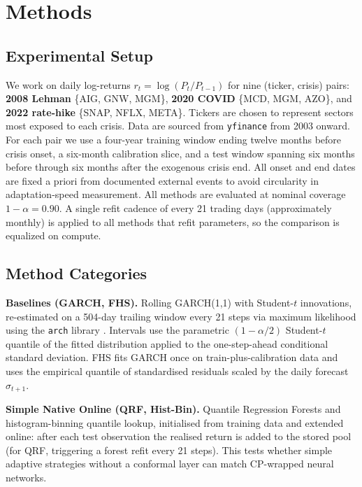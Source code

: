 \documentclass{article}
\begin{document}
\section{Methods}

\subsection{Experimental Setup}

We work on daily log-returns \(r_t = \log(P_t / P_{t-1})\) for nine (ticker, crisis) pairs: \textbf{2008 Lehman} \{AIG, GNW, MGM\}, \textbf{2020 COVID} \{MCD, MGM, AZO\}, and \textbf{2022 rate-hike} \{SNAP, NFLX, META\}. Tickers are chosen to represent sectors most exposed to each crisis. Data are sourced from \texttt{yfinance} from 2003 onward. For each pair we use a four-year training window ending twelve months before crisis onset, a six-month calibration slice, and a test window spanning six months before through six months after the exogenous crisis end. All onset and end dates are fixed a priori from documented external events to avoid circularity in adaptation-speed measurement. All methods are evaluated at nominal coverage \(1 - \alpha = 0.90\). A single refit cadence of every 21 trading days (approximately monthly) is applied to all methods that refit parameters, so the comparison is equalized on compute.

\subsection{Method Categories}

\textbf{Baselines (GARCH, FHS).} Rolling GARCH(1,1) with Student-\(t\) innovations, re-estimated on a 504-day trailing window every 21 steps via maximum likelihood using the \texttt{arch} library \citep{sheppard2022}. Intervals use the parametric \((1-\alpha/2)\) Student-\(t\) quantile of the fitted distribution applied to the one-step-ahead conditional standard deviation. FHS fits GARCH once on train-plus-calibration data and uses the empirical quantile of standardised residuals scaled by the daily forecast \(\sigma_{t+1}\).

\textbf{Simple Native Online (QRF, Hist-Bin).} Quantile Regression Forests \citep{meinshausen2006} and histogram-binning quantile lookup, initialised from training data and extended online: after each test observation the realised return is added to the stored pool (for QRF, triggering a forest refit every 21 steps). This tests whether simple adaptive strategies without a conformal layer can match CP-wrapped neural networks.
\end{document}
